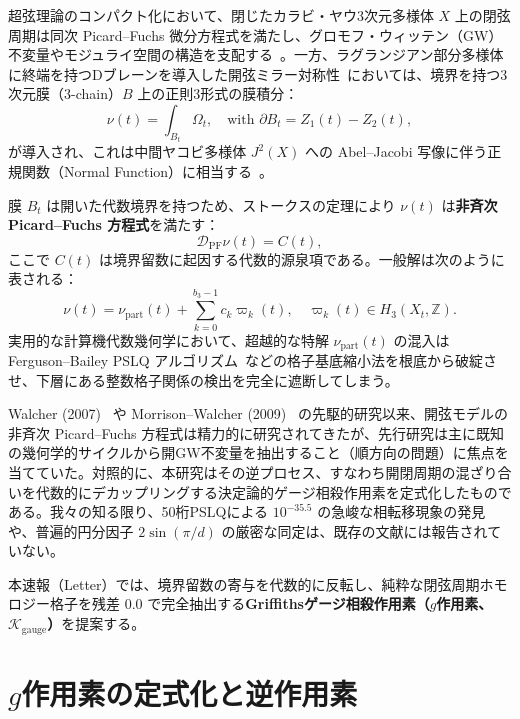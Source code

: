 \documentclass[11pt,a4paper]{article}
\theoremstyle{definition}
\begin{document}
超弦理論のコンパクト化において、閉じたカラビ・ヤウ3次元多様体 $X$ 上の閉弦周期は同次 Picard--Fuchs 微分方程式を満たし、グロモフ・ウィッテン（GW）不変量やモジュライ空間の構造を支配する~\cite{Candelas1991}。一方、ラグランジアン部分多様体に終端を持つDブレーンを導入した開弦ミラー対称性~\cite{Walcher2007,MorrisonWalcher2009}においては、境界を持つ3次元膜（3-chain）$B$ 上の正則3形式の膜積分：
\begin{equation}
\nu(t) = \int_{B_t} \Omega_t, \quad \text{with } \partial B_t = Z_1(t) - Z_2(t),
\end{equation}
が導入され、これは中間ヤコビ多様体 $J^2(X)$ への Abel--Jacobi 写像に伴う正規関数（Normal Function）に相当する~\cite{Griffiths1969,Voisin2002}。

膜 $B_t$ は開いた代数境界を持つため、ストークスの定理により $\nu(t)$ は\textbf{非斉次 Picard--Fuchs 方程式}を満たす：
\begin{equation}
\mathcal{D}_{\text{PF}} \nu(t) = C(t),
\end{equation}
ここで $C(t)$ は境界留数に起因する代数的源泉項である。一般解は次のように表される：
\begin{equation}
\nu(t) = \nu_{\text{part}}(t) + \sum_{k=0}^{b_3-1} c_k \varpi_k(t), \quad \varpi_k(t) \in H_3(X_t, \mathbb{Z}).
\end{equation}
実用的な計算機代数幾何学において、超越的な特解 $\nu_{\text{part}}(t)$ の混入は Ferguson--Bailey PSLQ アルゴリズム~\cite{FergusonBailey1992}などの格子基底縮小法を根底から破綻させ、下層にある整数格子関係の検出を完全に遮断してしまう。

Walcher (2007)~\cite{Walcher2007} や Morrison--Walcher (2009)~\cite{MorrisonWalcher2009} の先駆的研究以来、開弦モデルの非斉次 Picard--Fuchs 方程式は精力的に研究されてきたが、先行研究は主に既知の幾何学的サイクルから開GW不変量を抽出すること（順方向の問題）に焦点を当てていた。対照的に、本研究はその逆プロセス、すなわち開閉周期の混ざり合いを代数的にデカップリングする決定論的ゲージ相殺作用素を定式化したものである。我々の知る限り、50桁PSLQによる $10^{-35.5}$ の急峻な相転移現象の発見や、普遍的円分因子 $2\sin(\pi/d)$ の厳密な同定は、既存の文献には報告されていない。

本速報（Letter）では、境界留数の寄与を代数的に反転し、純粋な閉弦周期ホモロジー格子を残差 0.0 で完全抽出する\textbf{Griffithsゲージ相殺作用素（$g$作用素、$\mathcal{K}_{\text{gauge}}$）}を提案する。

\section{$g$作用素の定式化と逆作用素}
\end{document}
